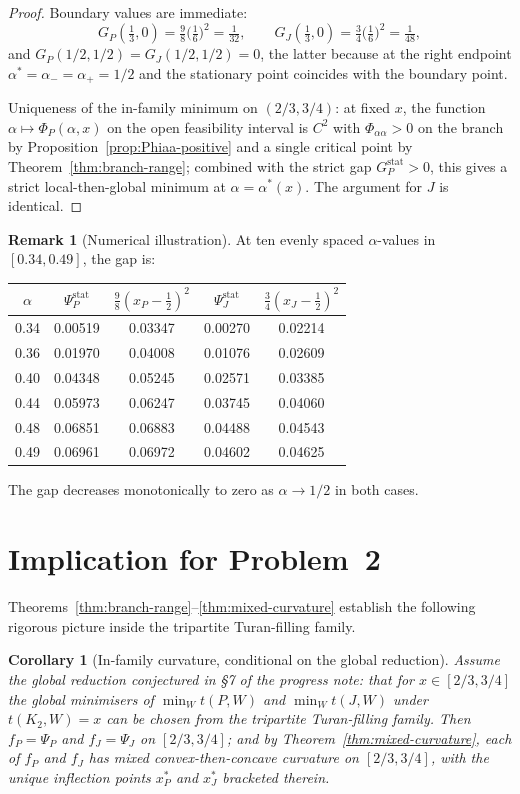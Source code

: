 \documentclass[11pt]{amsart}
\newtheorem{corollary}[theorem]{Corollary}
\theoremstyle{definition}
\newtheorem{remark}[theorem]{Remark}
\begin{document}
\begin{proof}
Boundary values are immediate:
\[
   G_P(\tfrac13,0) = \tfrac98\bigl(\tfrac16\bigr)^2 = \tfrac1{32},\qquad
   G_J(\tfrac13,0) = \tfrac34\bigl(\tfrac16\bigr)^2 = \tfrac1{48},
\]
and $G_P(1/2, 1/2) = G_J(1/2, 1/2) = 0$, the latter because at the right
endpoint $\alpha^*=\alpha_-=\alpha_+=1/2$ and the stationary point coincides
with the boundary point.

Uniqueness of the in-family minimum on $(2/3,3/4)$: at fixed $x$, the
function $\alpha\mapsto\Phi_P(\alpha,x)$ on the open feasibility interval is
$C^2$ with $\Phi_{\alpha\alpha}>0$ on the branch by
Proposition~\ref{prop:Phiaa-positive} and a single critical point by
Theorem~\ref{thm:branch-range}; combined with the strict gap
$G_P^{\mathrm{stat}}>0$, this gives a strict local-then-global minimum at
$\alpha=\alpha^*(x)$.  The argument for $J$ is identical.
\end{proof}

\begin{remark}[Numerical illustration]
At ten evenly spaced $\alpha$-values in $[0.34,0.49]$, the gap is:
\begin{center}
\begin{tabular}{c||c|c||c|c}
$\alpha$ & $\Psi_P^{\text{stat}}$ & $\tfrac98(x_P-\tfrac12)^2$
         & $\Psi_J^{\text{stat}}$ & $\tfrac34(x_J-\tfrac12)^2$ \\ \hline
0.34 & 0.00519 & 0.03347 & 0.00270 & 0.02214 \\
0.36 & 0.01970 & 0.04008 & 0.01076 & 0.02609 \\
0.40 & 0.04348 & 0.05245 & 0.02571 & 0.03385 \\
0.44 & 0.05973 & 0.06247 & 0.03745 & 0.04060 \\
0.48 & 0.06851 & 0.06883 & 0.04488 & 0.04543 \\
0.49 & 0.06961 & 0.06972 & 0.04602 & 0.04625
\end{tabular}
\end{center}
The gap decreases monotonically to zero as $\alpha\to 1/2$ in both cases.
\end{remark}

\section{Implication for Problem~2}

Theorems~\ref{thm:branch-range}--\ref{thm:mixed-curvature} establish
the following rigorous picture inside the tripartite Turan-filling family.

\begin{corollary}[In-family curvature, conditional on the global reduction]
Assume the global reduction conjectured in \S7 of the progress note:
that for $x\in[2/3,3/4]$ the global minimisers of $\min_W t(P,W)$ and
$\min_W t(J,W)$ under $t(K_2,W)=x$ can be chosen from the tripartite
Turan-filling family.  Then $f_P=\Psi_P$ and $f_J=\Psi_J$ on $[2/3,3/4]$;
and by Theorem~\ref{thm:mixed-curvature}, each of $f_P$ and $f_J$ has
mixed convex-then-concave curvature on $[2/3,3/4]$, with the unique
inflection points $x^*_P$ and $x^*_J$ bracketed therein.
\end{corollary}
\end{document}
